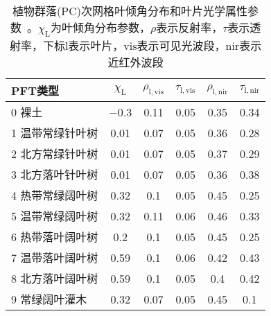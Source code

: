 \begin{table}[htbp]
  \centering
  \caption[植物群落(PC)次网格叶倾角分布和叶片光学属性参数]{植物群落(PC)次网格叶倾角分布和叶片光学属性参数~\citep{majasalmi2019evaluation,dong2021effects}。$\chi_{\mathrm {L}} $为叶倾角分布参数，$\rho$表示反射率，$\tau$表示透射率，下标${\mathrm {l}}$表示叶片，${\mathrm {vis}}$表示可见光波段，${\mathrm {nir}}$表示近红外波段}
  \label{tab:PC叶倾角分布和叶片光学属性参数}
  \begin{tabular}{@{}lccccc@{}}
    \toprule
    PFT类型             & $\chi_{\mathrm {L}} $ & $\rho_{\mathrm{l,vis}}$ & $\tau_{\mathrm{l,vis}}$ & $\rho_{\mathrm{l,nir}}$ & $\tau_{\mathrm{l,nir}}$ \\ \midrule
    0 裸土              & \num {-0.3 }          & 0.11                    & 0.05                    & 0.35                    & 0.34                    \\
    1 温带常绿针叶树    & 0.01                  & 0.07                    & 0.05                    & 0.36                    & 0.28                    \\
    2 北方常绿针叶树    & 0.01                  & 0.07                    & 0.05                    & 0.37                    & 0.29                    \\
    3 北方落叶针叶树    & 0.01                  & 0.07                    & 0.05                    & 0.36                    & 0.38                    \\
    4 热带常绿阔叶树    & 0.32                  & 0.1                     & 0.05                    & 0.45                    & 0.25                    \\
    5 温带常绿阔叶树    & 0.32                  & 0.11                    & 0.06                    & 0.46                    & 0.33                    \\
    6 热带落叶阔叶树    & 0.2                   & 0.1                     & 0.05                    & 0.45                    & 0.25                    \\
    7 温带落叶阔叶树    & 0.59                  & 0.1                     & 0.06                    & 0.42                    & 0.43                    \\
    8 北方落叶阔叶树    & 0.59                  & 0.1                     & 0.05                    & 0.4                     & 0.42                    \\
    9 常绿阔叶灌木      & 0.32                  & 0.07                    & 0.05                    & 0.45                    & 0.1                     \\

\end{tabular}
\end{table}
